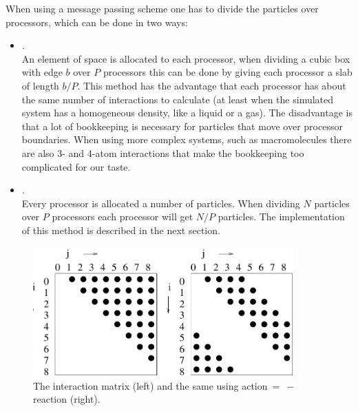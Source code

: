 When using a message passing scheme one has to divide the particles 
over processors, which can be done in two ways:
\begin{itemize}
\item   {\em {}.}\\
        An element of space is allocated to each processor, when dividing
        a cubic box with edge $b$ over $P$ processors this can be done 
        by giving
        each processor a slab of length $b/P$. This method 
        has the advantage
        that each processor has about the same number of interactions
        to calculate (at least when the simulated system has a homogeneous
        density, like a liquid or a gas). The disadvantage is that a lot of
        bookkeeping is necessary for particles that move over processor
        boundaries. When using more complex systems, such as macromolecules there
        are also 3- and 4-atom interactions that make 
  	the bookkeeping too complicated for our taste.
\item   {\em {}.}\\
        Every processor is allocated a number of particles. When
        dividing $N$ particles over $P$ processors each processor will
        get $N/P$ particles. The implementation of this method
        is described in the next section.
\end{itemize}

\begin {figure}[p]
\centerline{\includegraphics[width=10cm]{plots/int_mat}}
\caption[The interaction matrix.]{The interaction matrix (left) and
the same using action$~=~-$reaction (right).}
\label{fig:int_mat}
\end {figure}

